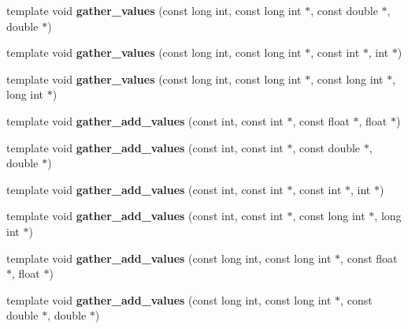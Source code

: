 \begin{DoxyCompactItemize}
template void {\bfseries gather\+\_\+values} (const long int, const long int $\ast$, const double $\ast$, double $\ast$)
\item 
\mbox{\label{namespaceschwz_a3d12e403a66aba1b9d5b5a08d8e3013b}} 
template void {\bfseries gather\+\_\+values} (const long int, const long int $\ast$, const int $\ast$, int $\ast$)
\item 
\mbox{\label{namespaceschwz_a3d79bead3c437129ee3f0e4fb9539a2e}} 
template void {\bfseries gather\+\_\+values} (const long int, const long int $\ast$, const long int $\ast$, long int $\ast$)
\item 
\mbox{\label{namespaceschwz_a608fa0d41c169ac77975688d1192ca9b}} 
template void {\bfseries gather\+\_\+add\+\_\+values} (const int, const int $\ast$, const float $\ast$, float $\ast$)
\item 
\mbox{\label{namespaceschwz_ae44b8950fbaff078114f2fd70dae814d}} 
template void {\bfseries gather\+\_\+add\+\_\+values} (const int, const int $\ast$, const double $\ast$, double $\ast$)
\item 
\mbox{\label{namespaceschwz_aaa932205d942d675ce5193c901b51ca8}} 
template void {\bfseries gather\+\_\+add\+\_\+values} (const int, const int $\ast$, const int $\ast$, int $\ast$)
\item 
\mbox{\label{namespaceschwz_a19bce0fe76febda77ab85a7a42e9f246}} 
template void {\bfseries gather\+\_\+add\+\_\+values} (const int, const int $\ast$, const long int $\ast$, long int $\ast$)
\item 
\mbox{\label{namespaceschwz_aed13f03b9a8d44eb43ce16ea4dd489a0}} 
template void {\bfseries gather\+\_\+add\+\_\+values} (const long int, const long int $\ast$, const float $\ast$, float $\ast$)
\item 
\mbox{\label{namespaceschwz_a779e1ca076ad997ce50d54ecdef0a3fb}} 
template void {\bfseries gather\+\_\+add\+\_\+values} (const long int, const long int $\ast$, const double $\ast$, double $\ast$)
\item 
\mbox{\label{namespaceschwz_a29acf621d2dc1e5fcf181c9daed0ad6c}} 

\end{DoxyCompactItemize}
